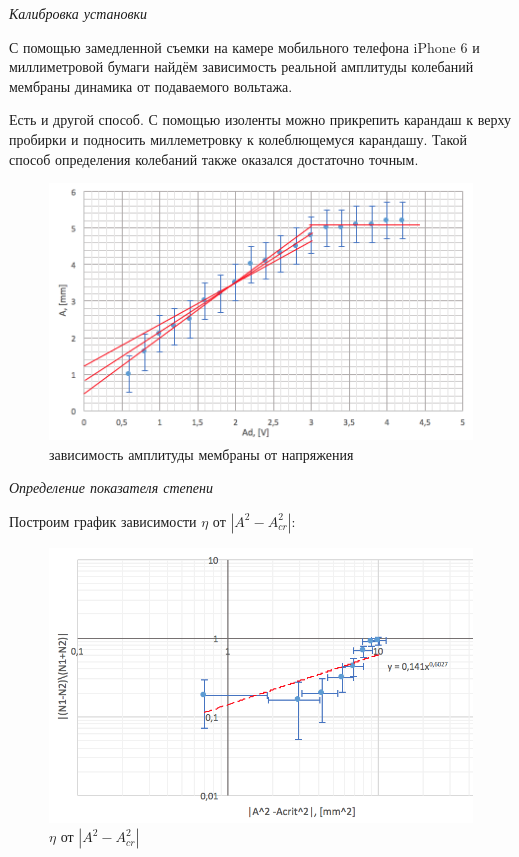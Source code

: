 \documentclass[a4paper, 12pt]{article}
\begin{document}
\emph{Калибровка установки}

С помощью замедленной съемки на камере мобильного телефона iPhone 6 и миллиметровой бумаги найдём зависимость реальной амплитуды колебаний мембраны динамика от подаваемого вольтажа.

Есть и другой способ. С помощью изоленты можно прикрепить карандаш к верху пробирки и подносить миллеметровку к колеблющемуся карандашу. Такой способ определения колебаний также оказался достаточно точным.


\begin{figure}
	\includegraphics[scale=0.8]{img/A(V).jpg}
	\caption{зависимость амплитуды мембраны от напряжения}
\end{figure}

\emph{Определение показателя степени}

Построим график зависимости $\eta$ от $|A^2 - A_{cr}^2|$:

\begin{figure}[h]
	\includegraphics[scale=1.25]{img/result.jpg}
	\caption{$\eta$ от $|A^2 - A_{cr}^2|$}
\end{figure}
\end{document}
